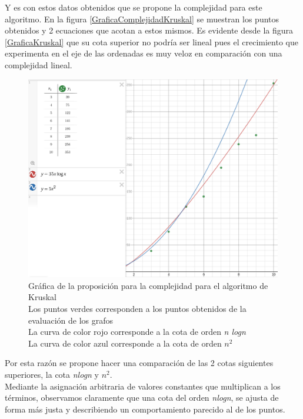         Y es con estos datos obtenidos que se propone la complejidad para este algoritmo. En la figura \ref{GraficaComplejidadKruskal} se muestran los puntos obtenidos y 2 ecuaciones que acotan a estos mismos. Es evidente desde la figura \ref{GraficaKruskal} que su cota superior no podría ser lineal pues el crecimiento que experimenta en el eje de las ordenadas es muy veloz en comparación con una complejidad lineal.\\
        
        \begin{figure}[h!]
            \centering
            \includegraphics[width=19cm]{Kruskal/GraficaComplejidadKruskal.png}
            \caption{Gráfica de la proposición para la complejidad para el algoritmo de Kruskal\\ Los puntos verdes corresponden a los puntos obtenidos de la evaluación de los grafos \\ La curva de color rojo corresponde a la cota de orden \textit{n logn}\\ La curva de color azul corresponde a la cota de orden $n^2$}
            \label{fig:my_label}
        \end{figure}
        
        Por esta razón se propone hacer una comparación de las 2 cotas siguientes superiores, la cota \textit{nlogn} y $n^2$.\\
        
        Mediante la asignación arbitraria de valores constantes que multiplican a los términos, observamos claramente que una cota del orden \textit{nlogn}, se ajusta de forma más justa y describiendo un comportamiento parecido al de los puntos.\\
        

